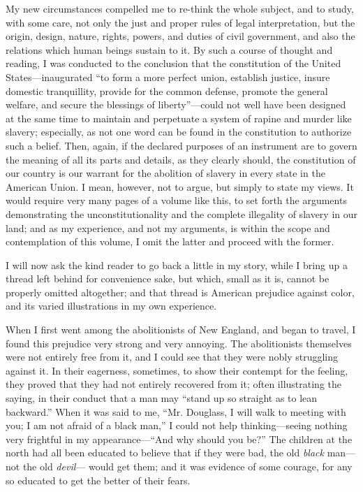 My new circumstances compelled me to re-think the whole subject, and to
study, with some care, not only the just and proper rules of legal
interpretation, but the origin, design, nature, rights, powers, and
duties of civil government, and also the relations which human beings
sustain to it. By such a course of thought and reading, I was conducted
to the conclusion that the constitution of the United
States---inaugurated ``to form a more perfect union, establish justice,
insure domestic tranquillity, provide for the common defense, promote
the general welfare, and secure the blessings of liberty''---could not
well have been designed at the same time to maintain and perpetuate a
system of rapine and murder like slavery; especially, as not one word
can be found in the constitution to authorize such a belief. Then,
again, if the declared purposes of an instrument are to govern the
meaning of all its parts and details, as they clearly {}should, the
constitution of our country is our warrant for the abolition of slavery
in every state in the American Union. I mean, however, not to argue, but
simply to state my views. It would require very many pages of a volume
like this, to set forth the arguments demonstrating the
unconstitutionality and the complete illegality of slavery in our land;
and as my experience, and not my arguments, is within the scope and
contemplation of this volume, I omit the latter and proceed with the
former.

I will now ask the kind reader to go back a little in my story, while I
bring up a thread left behind for convenience sake, but which, small as
it is, cannot be properly omitted altogether; and that thread is
American prejudice against color, and its varied illustrations in my own
experience.

When I first went among the abolitionists of New England, and began to
travel, I found this prejudice very strong and very annoying. The
abolitionists themselves were not entirely free from it, and I could see
that they were nobly struggling against it. In their eagerness,
sometimes, to show their contempt for the feeling, they proved that they
had not entirely recovered from it; often illustrating the saying, in
their conduct that a man may ``stand up so straight as to lean
backward.'' When it was said to me, ``Mr. Douglass, I will walk to
meeting with you; I am not afraid of a black man,'' I could not help
thinking---seeing nothing very frightful in my appearance---``And why
should you be?'' The children at the north had all been educated to
believe that if they were bad, the old \emph{black} man---not the old
\emph{devil}--- {}would get them; and it was evidence of some courage,
for any so educated to get the better of their fears.

